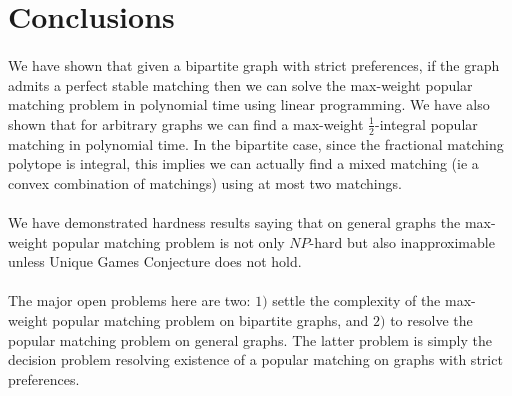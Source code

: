 \documentclass[letterpaper,12pt,oneside,onecolumn]{article}
\begin{document}
\section{Conclusions}
\paragraph{}
We have shown that given a bipartite graph with strict preferences, if the graph admits a perfect stable matching then we can solve the max-weight popular matching problem in polynomial time using linear programming. We have also shown that for arbitrary graphs we can find a max-weight $\frac{1}{2}$-integral popular matching in polynomial time. In the bipartite case, since the fractional matching polytope is integral, this implies we can actually find a mixed matching (ie a convex combination of matchings) using at most two matchings.
\paragraph{}
We have demonstrated hardness results saying that on general graphs the max-weight popular matching problem is not only $NP$-hard but also inapproximable unless Unique Games Conjecture does not hold.
\paragraph{}
The major open problems here are two: $1)$ settle the complexity of the max-weight popular matching problem on bipartite graphs, and $2)$ to resolve the popular matching problem on general graphs. The latter problem is simply the decision problem resolving existence of a popular matching on graphs with strict preferences.


\end{document}
